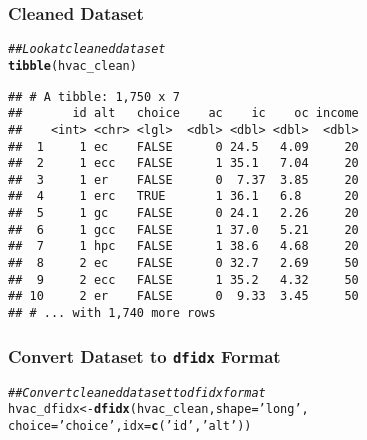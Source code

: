 \documentclass{beamer}\usepackage[]{graphicx}\usepackage[]{color}
\makeatletter
\newcommand{\hlstr}[1]{\textcolor[rgb]{0.192,0.494,0.8}{#1}}%
\newcommand{\hlcom}[1]{\textcolor[rgb]{0.678,0.584,0.686}{\textit{#1}}}%
\newcommand{\hlstd}[1]{\textcolor[rgb]{0.345,0.345,0.345}{#1}}%
\newcommand{\hlkwb}[1]{\textcolor[rgb]{0.69,0.353,0.396}{#1}}%
\newcommand{\hlkwc}[1]{\textcolor[rgb]{0.333,0.667,0.333}{#1}}%
\newcommand{\hlkwd}[1]{\textcolor[rgb]{0.737,0.353,0.396}{\textbf{#1}}}%
\newenvironment{kframe}{%
 \def\at@end@of@kframe{}%
 \ifinner\ifhmode%
  \def\at@end@of@kframe{\end{minipage}}%
  \begin{minipage}{\columnwidth}%
 \fi\fi%
 \def\FrameCommand##1{\hskip\@totalleftmargin \hskip-\fboxsep
 \colorbox{shadecolor}{##1}\hskip-\fboxsep
     \hskip-\linewidth \hskip-\@totalleftmargin \hskip\columnwidth}%
 \MakeFramed {\advance\hsize-\width
   \@totalleftmargin\z@ \linewidth\hsize
   \@setminipage}}%
 {\par\unskip\endMakeFramed%
 \at@end@of@kframe}
\newenvironment{knitrout}{}{} %
\makeatother
\begin{document}
\begin{frame}[fragile]\frametitle{Cleaned Dataset}
\begin{knitrout}\footnotesize
{}\color{fgcolor}\begin{kframe}
\begin{alltt}
\hlcom{## Look at cleaned dataset}
\hlkwd{tibble}\hlstd{(hvac_clean)}
\end{alltt}
\begin{verbatim}
## # A tibble: 1,750 x 7
##       id alt   choice    ac    ic    oc income
##    <int> <chr> <lgl>  <dbl> <dbl> <dbl>  <dbl>
##  1     1 ec    FALSE      0 24.5   4.09     20
##  2     1 ecc   FALSE      1 35.1   7.04     20
##  3     1 er    FALSE      0  7.37  3.85     20
##  4     1 erc   TRUE       1 36.1   6.8      20
##  5     1 gc    FALSE      0 24.1   2.26     20
##  6     1 gcc   FALSE      1 37.0   5.21     20
##  7     1 hpc   FALSE      1 38.6   4.68     20
##  8     2 ec    FALSE      0 32.7   2.69     50
##  9     2 ecc   FALSE      1 35.2   4.32     50
## 10     2 er    FALSE      0  9.33  3.45     50
## # ... with 1,740 more rows
\end{verbatim}
\end{kframe}
\end{knitrout}
\end{frame}

\begin{frame}[fragile]\frametitle{Convert Dataset to \texttt{dfidx} Format}
\begin{knitrout}\footnotesize
{}\color{fgcolor}\begin{kframe}
\begin{alltt}
\hlcom{## Convert cleaned dataset to dfidx format}
\hlstd{hvac_dfidx} \hlkwb{<-} \hlkwd{dfidx}\hlstd{(hvac_clean,} \hlkwc{shape} \hlstd{=} \hlstr{'long'}\hlstd{,}
                    \hlkwc{choice} \hlstd{=} \hlstr{'choice'}\hlstd{,} \hlkwc{idx} \hlstd{=} \hlkwd{c}\hlstd{(}\hlstr{'id'}\hlstd{,} \hlstr{'alt'}\hlstd{))}
\end{alltt}
\end{kframe}
\end{knitrout}
\end{frame}
\end{document}
